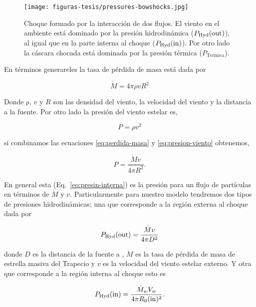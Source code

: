 \begin{figure}
  \centering
  \texttt{[image: figuras-tesis/pressures-bowshocks.jpg]}
  \caption{Choque formado por la interacción de dos flujos. El viento en el ambiente está dominado por la presión hidrodinámica  (\(P_{\text{Hyd}}(\mathrm{out}{})\)), al igual que en la parte interna al choque (\(P_{\text{Hyd}}(\mathrm{in}{})\)). Por otro lado la cáscara chocada está dominada por la presión térmica (\(P_{\text{Termica}}\)).}
  \label{fig:interaction}
\end{figure}

 En términos generareles la tasa de pérdida de masa está dada por

\begin{equation}
  \label{eq:perdida-masa}
  \dot{M}=4\pi \rho v R^{2}
\end{equation}

Donde \(\mathrm{\rho}\), \(v\) y \(R\) son las densidad del viento, la velocidad del viento y la distancia a la fuente. Por otro lado la presión del viento estelar es,

\begin{equation}
  \label{eq:presion-viento}
  P=\rho v^{2}
\end{equation}

si combinamos las ecuaciones \ref{eq:perdida-masa} y \ref{eq:presion-viento} obtenemos,

\begin{equation}
  \label{eq:presin-interna}
  P=\frac{\dot{M} v}{4 \pi R^{2}}. 
\end{equation}
 
En general esta (Eq.~\ref{eq:presin-interna}) es la presión para un flujo de partículas en términos de \(\dot{M}\) y \(v\). Particularmente para nuestro modelo tendremos  dos tipos de presiones hidrodinámicas; una que corresponde a la región externa al choque dada por

\begin{equation}
  \label{eq:presion-externa}
   P_{\text{Hyd}}(\mathrm{out}{})=\frac{\dot{M}v}{4 \pi D^{2}}
\end{equation}

donde \(D\) es la distancia de la fuente a \thC{}, \(\dot{M}\) es la tasa de pérdida de masa de estrella masiva del Trapecio y \(v\) es la velocidad del viento estelar externo. Y otra que corresponde a la región interna al choque esto es

 
\begin{equation}
  \label{eq:presion-interna}
  P_{\text{Hyd}}(\mathrm{in}{})=\frac{\dot{M}_{w} V_{w}}{4 \pi R_{0}(\mathrm{in}{})^{2}}.
\end{equation}

